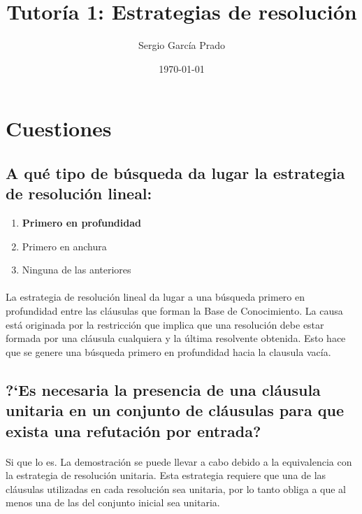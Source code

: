 \documentclass[10pt, a4paper,spanish]{article}
\title{\vspace{-15mm}\fontsize{24pt}{10pt}\selectfont\textbf{Tutoría 1: Estrategias de resolución}} %
\author{Sergio García Prado}
\date{\today}
\begin{document}
	\maketitle %

	\thispagestyle{fancy} %



	\section{Cuestiones}

		\subsection{A qué tipo de búsqueda da lugar la estrategia de resolución lineal:}

			\begin{enumerate}[label=\Alph*)]
				\item \textbf{Primero en profundidad}
				\item Primero en anchura
				\item Ninguna de las anteriores
			\end{enumerate}

			\paragraph{}
			La estrategia de resolución lineal da lugar a una búsqueda primero en profundidad entre las cláusulas que forman la Base de Conocimiento. La causa está originada por la restricción que implica que una resolución debe estar formada por una cláusula cualquiera y la última resolvente obtenida. Esto hace que se genere una búsqueda primero en profundidad hacia la clausula vacía.


		\subsection{?`Es necesaria la presencia de una cláusula unitaria en un conjunto de cláusulas para que exista una refutación por entrada?}

			\paragraph{}
			Si que lo es. La demostración se puede llevar a cabo debido a la equivalencia con la estrategia de resolución unitaria. Esta estrategia requiere que una de las cláusulas utilizadas en cada resolución sea unitaria, por lo tanto obliga a que al menos una de las del conjunto inicial sea unitaria.
\end{document}
